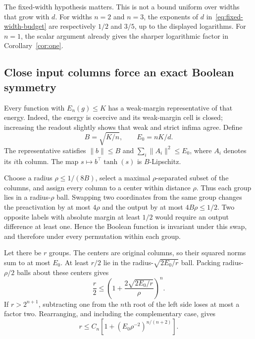 The fixed-width hypothesis matters. This is not a bound uniform over widths that grow with $d$. For widths $n=2$ and $n=3$, the exponents of $d$ in~\eqref{eq:fixed-width-budget} are respectively $1/2$ and $3/5$, up to the displayed logarithms. For $n=1$, the scalar argument already gives the sharper logarithmic factor in Corollary~\ref{cor:one}.

\subsection{Close input columns force an exact Boolean symmetry}
Every function with $E_n(g)\le K$ has a weak-margin representative of that energy. Indeed, the energy is coercive and its weak-margin cell is closed; increasing the readout slightly shows that weak and strict infima agree. Define
\[
 B=\sqrt{K/n},\qquad E_0=nK/d.
\]
The representative satisfies $\|b\|\le B$ and $\sum_i\|A_i\|^2\le E_0$, where $A_i$ denotes its $i$th column. The map $s\mapsto b^\top\tanh(s)$ is $B$-Lipschitz.

Choose a radius $\rho\le1/(8B)$, select a maximal $\rho$-separated subset of the columns, and assign every column to a center within distance $\rho$. Thus each group lies in a radius-$\rho$ ball. Swapping two coordinates from the same group changes the preactivation by at most $4\rho$ and the output by at most $4B\rho\le1/2$. Two opposite labels with absolute margin at least $1/2$ would require an output difference at least one. Hence the Boolean function is invariant under this swap, and therefore under every permutation within each group.

Let there be $r$ groups. The centers are original columns, so their squared norms sum to at most $E_0$. At least $r/2$ lie in the radius-$\sqrt{2E_0/r}$ ball. Packing radius-$\rho/2$ balls about these centers gives
\[
 \frac r2\le\left(1+\frac{2\sqrt{2E_0/r}}{\rho}\right)^n.
\]
If $r>2^{n+1}$, subtracting one from the $n$th root of the left side loses at most a factor two. Rearranging, and including the complementary case, gives
\begin{equation}\label{eq:column-group-count}
 r\le C_n\left[1+(E_0\rho^{-2})^{n/(n+2)}\right].
\end{equation}




